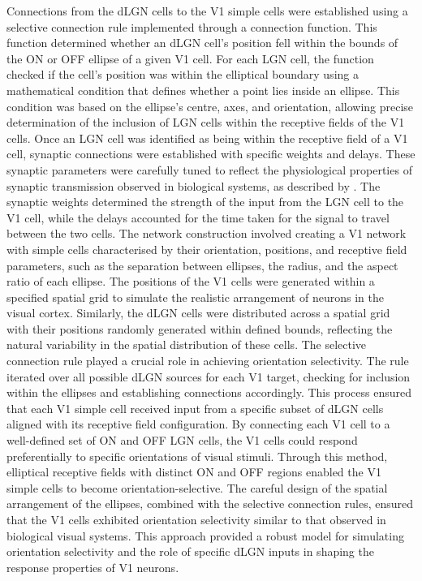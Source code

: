 \documentclass[12pt]{article}
\begin{document}
Connections from the dLGN cells to the V1 simple cells were established using a selective connection rule implemented through a connection function. This function determined whether an dLGN cell's position fell within the bounds of the ON or OFF ellipse of a given V1 cell. For each LGN cell, the function checked if the cell's position was within the elliptical boundary using a mathematical condition that defines whether a point lies inside an ellipse. This condition was based on the ellipse's centre, axes, and orientation, allowing precise determination of the inclusion of LGN cells within the receptive fields of the V1 cells. Once an LGN cell was identified as being within the receptive field of a V1 cell, synaptic connections were established with specific weights and delays. These synaptic parameters were carefully tuned to reflect the physiological properties of synaptic transmission observed in biological systems, as described by \textcite{durandComparisonVisualResponse2016}. The synaptic weights determined the strength of the input from the LGN cell to the V1 cell, while the delays accounted for the time taken for the signal to travel between the two cells. The network construction involved creating a V1 network with simple cells characterised by their orientation, positions, and receptive field parameters, such as the separation between ellipses, the radius, and the aspect ratio of each ellipse. The positions of the V1 cells were generated within a specified spatial grid to simulate the realistic arrangement of neurons in the visual cortex. Similarly, the dLGN cells were distributed across a spatial grid with their positions randomly generated within defined bounds, reflecting the natural variability in the spatial distribution of these cells. The selective connection rule played a crucial role in achieving orientation selectivity. The rule iterated over all possible dLGN sources for each V1 target, checking for inclusion within the ellipses and establishing connections accordingly. This process ensured that each V1 simple cell received input from a specific subset of dLGN cells aligned with its receptive field configuration. By connecting each V1 cell to a well-defined set of ON and OFF LGN cells, the V1 cells could respond preferentially to specific orientations of visual stimuli. Through this method, elliptical receptive fields with distinct ON and OFF regions enabled the V1 simple cells to become orientation-selective. The careful design of the spatial arrangement of the ellipses, combined with the selective connection rules, ensured that the V1 cells exhibited orientation selectivity similar to that observed in biological visual systems. This approach provided a robust model for simulating orientation selectivity and the role of specific dLGN inputs in shaping the response properties of V1 neurons.
\end{document}

